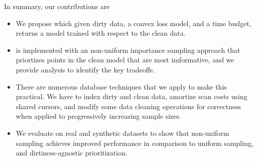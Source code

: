 In summary, our contributions are
\begin{itemize}[noitemsep]
\item We propose \sysfull which given dirty data, a convex loss model, and a time budget, returns a model trained with respect to the clean data.
\item \sysfull is implemented with an non-uniform importance sampling approach that priortizes points in the clean model that are most imformative, and we provide analysis to identify the key tradeoffs.
\item There are numerous database techniques that we apply to make this practical. We have to index dirty and clean data, amortize scan costs using shared cursors, and modify some data cleaning operations for correctness when applied to progressively increasing sample sizes.
\item We evaluate \sysfull on real and synthetic datasets to show that non-uniform sampling achieves improved performance in comparison to uniform sampling, and dirtiness-agnostic prioritization.
\end{itemize}








